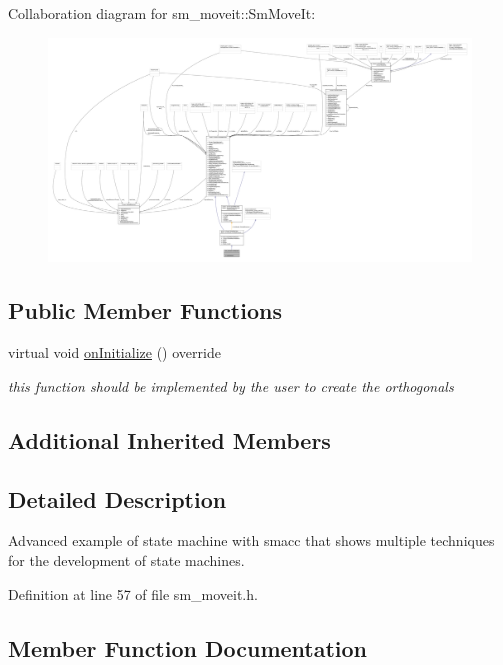 Collaboration diagram for sm\+\_\+moveit\+:\+:Sm\+Move\+It\+:
\nopagebreak
\begin{figure}[H]
\begin{center}
\leavevmode
\includegraphics[width=350pt]{structsm__moveit_1_1SmMoveIt__coll__graph}
\end{center}
\end{figure}
\subsection*{Public Member Functions}
\begin{DoxyCompactItemize}
\item 
virtual void \hyperlink{structsm__moveit_1_1SmMoveIt_af2af89c1cb101214c2925b0818d74be5}{on\+Initialize} () override
\begin{DoxyCompactList}\small\item\em this function should be implemented by the user to create the orthogonals \end{DoxyCompactList}\end{DoxyCompactItemize}
\subsection*{Additional Inherited Members}


\subsection{Detailed Description}
Advanced example of state machine with smacc that shows multiple techniques for the development of state machines. 

Definition at line 57 of file sm\+\_\+moveit.\+h.



\subsection{Member Function Documentation}
